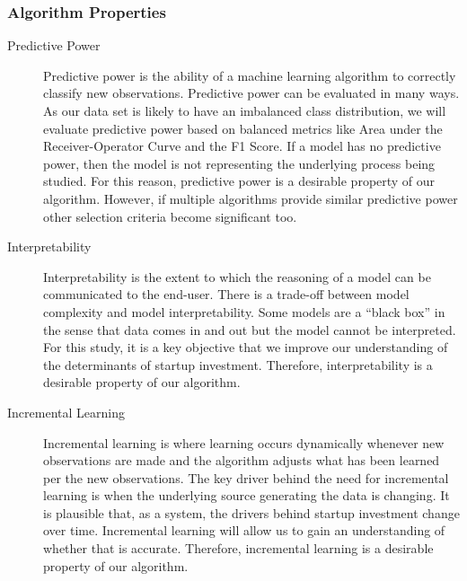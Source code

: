 \documentclass[../thesis/thesis.tex]{subfiles}
\begin{document}
\begin{refsection}
\begin{description}
\end{description}

\subsubsection{Algorithm Properties}

\begin{description}

\item[Predictive Power]

Predictive power is the ability of a machine learning algorithm to correctly classify new observations. Predictive power can be evaluated in many ways. As our data set is likely to have an imbalanced class distribution, we will evaluate predictive power based on balanced metrics like Area under the Receiver-Operator Curve and the F1 Score. If a model has no predictive power, then the model is not representing the underlying process being studied. For this reason, predictive power is a desirable property of our algorithm. However, if multiple algorithms provide similar predictive power other selection criteria become significant too.

\item[Interpretability]

Interpretability is the extent to which the reasoning of a model can be communicated to the end-user. There is a trade-off between model complexity and model interpretability. Some models are a ``black box'' in the sense that data comes in and out but the model cannot be interpreted. For this study, it is a key objective that we improve our understanding of the determinants of startup investment. Therefore, interpretability is a desirable property of our algorithm.

\item[Incremental Learning]

Incremental learning is where learning occurs dynamically whenever new observations are made and the algorithm adjusts what has been learned per the new observations. The key driver behind the need for incremental learning is when the underlying source generating the data is changing. It is plausible that, as a system, the drivers behind startup investment change over time. Incremental learning will allow us to gain an understanding of whether that is accurate. Therefore, incremental learning is a desirable property of our algorithm.

\end{description}


\end{refsection}
\end{document}

